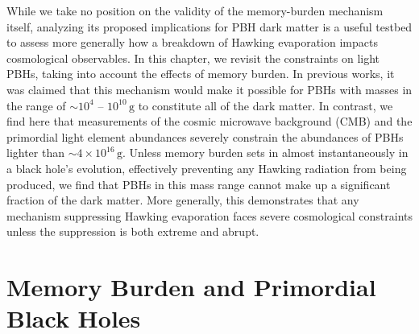 While we take no position on the validity of the memory-burden mechanism itself, analyzing its proposed implications for PBH dark matter is a useful testbed to assess more generally how a breakdown of Hawking evaporation impacts cosmological observables. In this chapter, we revisit  the constraints on light PBHs, taking into account the effects of memory burden. In previous works, it was claimed that this mechanism would make it possible for PBHs with masses in the range of $\sim 10^{4}$ -- $10^{10}\,\mathrm{g}$ to constitute all of the dark matter. In contrast, we find here that measurements of the cosmic microwave background (CMB) and the primordial light element abundances severely constrain the abundances of PBHs lighter than $\sim 4 \times 10^{16}\,\mathrm{g}$. Unless memory burden sets in almost instantaneously in a black hole's evolution, effectively preventing any Hawking radiation from being produced, we find that PBHs in this mass range cannot make up a significant fraction of the dark matter. More generally, this demonstrates that any mechanism suppressing Hawking evaporation faces severe cosmological constraints unless the suppression is both extreme and abrupt.


\section{Memory Burden and Primordial Black Holes}
\label{sec:ch10-memory-burden}

